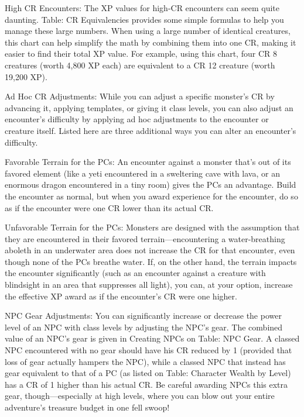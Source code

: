 High CR Encounters: The XP values for high-CR encounters can seem quite daunting. Table: CR Equivalencies provides some simple formulas to help you manage these large numbers. When using a large number of identical creatures, this chart can help simplify the math by combining them into one CR, making it easier to find their total XP value. For example, using this chart, four CR 8 creatures (worth 4,800 XP each) are equivalent to a CR 12 creature (worth 19,200 XP).
				
Ad Hoc CR Adjustments: While you can adjust a specific monster's CR by advancing it, applying templates, or giving it class levels, you can also adjust an encounter's difficulty by applying ad hoc adjustments to the encounter or creature itself. Listed here are three additional ways you can alter an encounter's difficulty.
				
Favorable Terrain for the PCs: An encounter against a monster that's out of its favored element (like a yeti encountered in a sweltering cave with lava, or an enormous dragon encountered in a tiny room) gives the PCs an advantage. Build the encounter as normal, but when you award experience for the encounter, do so as if the encounter were one CR lower than its actual CR.
				
Unfavorable Terrain for the PCs: Monsters are designed with the assumption that they are encountered in their favored terrain---encountering a water-breathing aboleth in an underwater area does not increase the CR for that encounter, even though none of the PCs breathe water. If, on the other hand, the terrain impacts the encounter significantly (such as an encounter against a creature with blindsight in an area that suppresses all light), you can, at your option, increase the effective XP award as if the encounter's CR were one higher.
				
NPC Gear Adjustments: You can significantly increase or decrease the power level of an NPC with class levels by adjusting the NPC's gear. The combined value of an NPC's gear is given in Creating NPCs on Table: NPC Gear. A classed NPC encountered with no gear should have his CR reduced by 1 (provided that loss of gear actually hampers the NPC), while a classed NPC that instead has gear equivalent to that of a PC (as listed on Table: Character Wealth by Level) has a CR of 1 higher than his actual CR. Be careful awarding NPCs this extra gear, though---especially at high levels, where you can blow out your entire adventure's treasure budget in one fell swoop!
				

